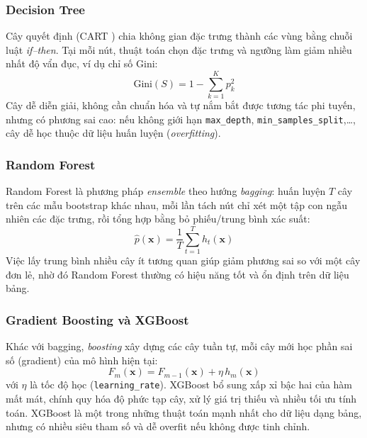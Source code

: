 \subsubsection{Decision Tree}
Cây quyết định (CART \cite{breiman1984}) chia không gian đặc trưng thành các vùng bằng chuỗi luật \textit{if--then}. Tại mỗi nút, thuật toán chọn đặc trưng và ngưỡng làm giảm nhiều nhất độ vẩn đục, ví dụ chỉ số Gini:
\begin{equation}
    \text{Gini}(S) = 1 - \sum_{k=1}^{K} p_k^2
\end{equation}
Cây dễ diễn giải, không cần chuẩn hóa và tự nắm bắt được tương tác phi tuyến, nhưng có phương sai cao: nếu không giới hạn \texttt{max\_depth}, \texttt{min\_samples\_split},\ldots, cây dễ học thuộc dữ liệu huấn luyện (\textit{overfitting}).

\subsubsection{Random Forest}
Random Forest \cite{breiman2001} là phương pháp \textit{ensemble} theo hướng \textit{bagging}: huấn luyện $T$ cây trên các mẫu bootstrap khác nhau, mỗi lần tách nút chỉ xét một tập con ngẫu nhiên các đặc trưng, rồi tổng hợp bằng bỏ phiếu/trung bình xác suất:
\begin{equation}
    \hat{p}(\mathbf{x}) = \frac{1}{T}\sum_{t=1}^{T} h_t(\mathbf{x})
\end{equation}
Việc lấy trung bình nhiều cây ít tương quan giúp giảm phương sai so với một cây đơn lẻ, nhờ đó Random Forest thường có hiệu năng tốt và ổn định trên dữ liệu bảng.

\subsubsection{Gradient Boosting và XGBoost}
Khác với bagging, \textit{boosting} xây dựng các cây tuần tự, mỗi cây mới học phần sai số (gradient) của mô hình hiện tại:
\begin{equation}
    F_m(\mathbf{x}) = F_{m-1}(\mathbf{x}) + \eta \, h_m(\mathbf{x})
\end{equation}
với $\eta$ là tốc độ học (\texttt{learning\_rate}). XGBoost \cite{chen2016} bổ sung xấp xỉ bậc hai của hàm mất mát, chính quy hóa độ phức tạp cây, xử lý giá trị thiếu và nhiều tối ưu tính toán. XGBoost là một trong những thuật toán mạnh nhất cho dữ liệu dạng bảng, nhưng có nhiều siêu tham số và dễ overfit nếu không được tinh chỉnh.

